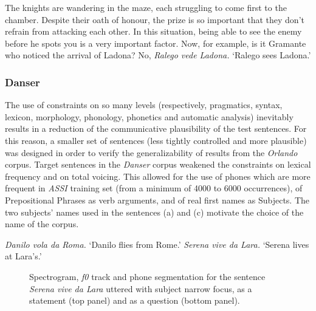 \clearpage
\eal
\ex The knights are wandering in the maze, each struggling to come first to the chamber. Despite their oath of honour, the prize is so important that they don't refrain from attacking each other. In this situation, being able to see the enemy before he spots you is a very important factor. Now, for example, is it Gramante who noticed the arrival of Ladona?  
\ex No, \textit{Ralego vede Ladona.}
\ex `Ralego sees Ladona.'
\zl

\subsubsection{Danser}\label{sec4212}
The use of constraints on so many levels (respectively, pragmatics, syntax, lexicon, morphology, phonology, phonetics and automatic analysis) inevitably results in a reduction of the communicative plausibility of the test sentences. For this reason, a smaller set of sentences (less tightly controlled and more plausible) was designed in order to verify the generalizability of results from the \textit{Orlando} corpus. Target sentences in the \textit{Danser} corpus weakened the constraints on lexical frequency and on total voicing. This allowed for the use of phones which are more frequent in \textit{ASSI} training set (from a minimum of 4000 to 6000 occurrences), of Prepositional Phrases as verb arguments, and of real first names as Subjects. The two subjects' names used in the sentences (a) and (c) motivate the choice of the name of the corpus.

\eal
\ex \textit{Danilo vola da Roma.}
\ex `Danilo flies from Rome.'
\ex \textit{Serena vive da Lara.}
\ex `Serena lives at Lara's.'
\zl

\begin{figure}
\centering
{}
\caption{Spectrogram, \textit{f0} track and phone segmentation for the sentence \textit{Serena vive da Lara} uttered with subject narrow focus, as a statement (top panel) and as a question (bottom panel).}
\label{fig401}\end{figure}

